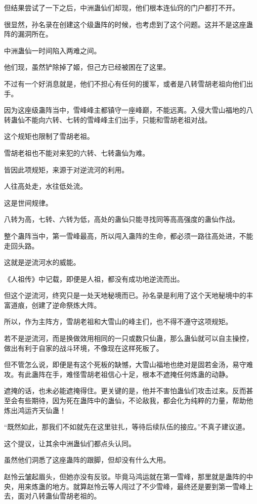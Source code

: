 \begin{this_body}
但结果尝试了一下之后，中洲蛊仙们却现，他们根本连仙窍的门户都打不开。

很显然，孙名录在创建这个级蛊阵的时候，也考虑到了这个问题。这并不是这座蛊阵的漏洞所在。

中洲蛊仙一时间陷入两难之间。

他们现，虽然铲除掉了姬，但己方已经被困在了这里。

不过有一个好消息就是，他们不担心有任何的援军，或者是八转雪胡老祖向他们出手。

因为这座级蛊阵当中，雪峰峰主都镇守一座峰巅，不能远离。入侵大雪山福地的八转蛊仙不能向六转、七转的雪峰峰主们出手，只能和雪胡老祖对战。

这个规矩也限制了雪胡老祖。

雪胡老祖也不能对来犯的六转、七转蛊仙为难。

皆因此项规矩，来源于对逆流河的利用。

人往高处走，水往低处流。

这是世间规律。

八转为高，七转、六转为低，高处的蛊仙只能寻找同等高高强度的蛊仙作战。

整个蛊阵当中，第一雪峰最高，所以闯入蛊阵的生命，都必须一路往高处进，不能走回头路。

这就是逆流河水的威能。

《人祖传》中记载，即便是人祖，都没有成功地逆流而出。

但这个逆流河，终究只是一处天地秘境而已。孙名录是利用了这个天地秘境中的丰富道痕，创建了逆命祭炼大阵。

所以，作为主阵方，雪胡老祖和大雪山的峰主们，也不得不遵守这项规矩。

若不是逆流河，而是换做效用相同的一只或数只仙蛊，那么蛊仙就可以自主操控，做出有利于自家的战斗环境，不像现在这样死板了。

但不管怎么说，即便是有这个死板的缺憾，大雪山福地也绝对是固若金汤，易守难攻。有此蛊阵在手，难怪雪胡老祖信心十足，根本不遮掩任何炼蛊的动静。

遮掩的话，也未必能遮掩得住。更关键的是，他并不害怕蛊仙们攻击过来。反而甚至会有些期待，因为死在蛊阵中的蛊仙，不论敌我，都会化为纯粹的力量，帮助他炼出鸿运齐天仙蛊！

“既然如此，那我们不如就先在这里驻扎，等待后续队伍的接应。”不真子建议道。

这个提议，让其余中洲蛊仙们都点头认同。

虽然他们洞悉了这座蛊阵的跟脚，但却没有什么大用。

赵怜云皱起眉头，但她亦没有反驳。毕竟马鸿运就在第一雪峰，那里就是蛊阵的中央，用来炼蛊的地方。就算赵怜云等人闯过了不少雪峰，最终还是要到第一雪峰上去，面对八转蛊仙雪胡老祖的。


\end{this_body}
